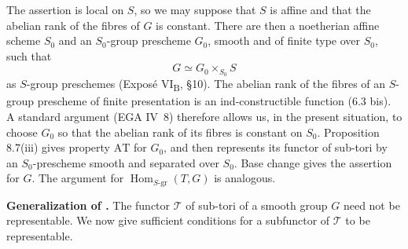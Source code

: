 The assertion is local on \(S\), so we may suppose that \(S\) is
affine and that the abelian rank of the fibres of \(G\) is constant.
There are then a noetherian affine scheme \(S_0\) and an
\(S_0\)-group prescheme \(G_0\), smooth and of finite type over
\(S_0\), such that
\[
  G\simeq G_0\times_{S_0}S
\]
as \(S\)-group preschemes (Exposé VI\textsubscript{B}, \S10).
The abelian rank of the fibres of an \(S\)-group prescheme of finite
presentation is an ind-constructible function (6.3 bis). A standard
argument (EGA IV~8) therefore allows us, in the present situation,
to choose \(G_0\) so that the abelian rank of its fibres is constant
on \(S_0\). Proposition 8.7(iii) gives property \(\mathrm{AT}\) for
\(G_0\), and  then represents its functor of sub-tori by
an \(S_0\)-prescheme smooth and separated over \(S_0\). Base change
gives the assertion for \(G\). The argument for
\(\operatorname{Hom}_{S\text{-gr}}(T,G)\) is analogous.

\medskip\noindent\textbf{Generalization of .}
The functor \(\mathcal T\) of sub-tori of a smooth group \(G\) need
not be representable. We now give sufficient conditions for a
subfunctor of \(\mathcal T\) to be representable.


